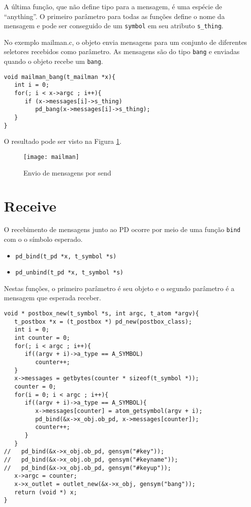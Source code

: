 A última função, que não define tipo para a mensagem, é uma espécie de ``anything''.
O primeiro parâmetro para todas as funções define o nome da mensagem e pode ser
conseguido de um \texttt{symbol} em seu atributo \texttt{s\_thing}.

No exemplo mailman.c, o objeto envia mensagens para um conjunto de diferentes 
seletores recebidos como parâmetro.
As mensagens são do tipo \texttt{bang} e enviadas quando o objeto recebe um \texttt{bang}.

\begin{lstlisting}[caption=Envio de mensagens bang por send]
void mailman_bang(t_mailman *x){
   int i = 0;
   for(; i < x->argc ; i++){
      if (x->messages[i]->s_thing)
         pd_bang(x->messages[i]->s_thing);
   }
}
\end{lstlisting}

O resultado pode ser visto na Figura \ref{fig:mailman}.
\begin{figure}[h!]
\centering
\texttt{[image: mailman]}
\caption{Envio de mensagens por send}
\label{fig:mailman}
\end{figure}


\section{Receive}

O recebimento de mensagens junto ao PD ocorre por meio de uma função
\texttt{bind} com o o símbolo esperado.

\begin{itemize}
   \item \texttt{pd\_bind(t\_pd *x, t\_symbol *s)}
   \item \texttt{pd\_unbind(t\_pd *x, t\_symbol *s)}
\end{itemize}

Nestas funções, o primeiro parâmetro é seu objeto e o segundo parâmetro é a
mensagem que esperada receber.

\begin{lstlisting}[caption=Exemplo de objeto que recebe várias mensagens]
void * postbox_new(t_symbol *s, int argc, t_atom *argv){
   t_postbox *x = (t_postbox *) pd_new(postbox_class);
   int i = 0;
   int counter = 0;
   for(; i < argc ; i++){
      if((argv + i)->a_type == A_SYMBOL)
         counter++;
   }
   x->messages = getbytes(counter * sizeof(t_symbol *));
   counter = 0;
   for(i = 0; i < argc ; i++){
      if((argv + i)->a_type == A_SYMBOL){
         x->messages[counter] = atom_getsymbol(argv + i);
         pd_bind(&x->x_obj.ob_pd, x->messages[counter]);
         counter++;
      }
   }
//   pd_bind(&x->x_obj.ob_pd, gensym("#key"));
//   pd_bind(&x->x_obj.ob_pd, gensym("#keyname"));
//   pd_bind(&x->x_obj.ob_pd, gensym("#keyup"));
   x->argc = counter;
   x->x_outlet = outlet_new(&x->x_obj, gensym("bang"));
   return (void *) x;
}
\end{lstlisting}

